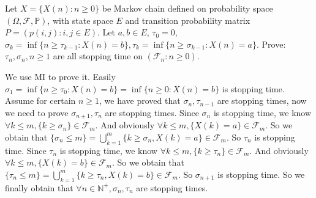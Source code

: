 \documentclass{ctexart}
\newif\ifpreface
\begin{document}
\large
\setlength{\baselineskip}{1.2em}
\ifpreface
  
\else
\fi
{}
\begin{problem}\label{pro:1}
  Let \(X=\{X(n): n \geq 0\}\) be Markov chain defined on probability space \((\Omega,\mathscr{F},\mathbb{P})\), with state space \(E\) and
  transition probability matrix \(P=(p(i,j):i,j \in E)\). Let \(a, b \in E\), \(\tau_0 =0\), \(\sigma_k = \inf \{n \geq \tau_{k-1}: X(n)=b\}, \tau_k=\inf\{n \geq \sigma_{k-1}: X(n)=a\}\).
  Prove: \(\tau_n,\sigma_n, n \geq 1 \) are all stopping time on \((\mathscr{F}_n: n \geq 0)\).
\end{problem}

\begin{solution}
  We use MI to prove it. Easily \(\sigma_1=\inf \{n \geq \tau_0:X(n)=b\}=\inf \{n \geq 0:X(n)=b\}\) is stopping time.
  Assume for certain \(n \geq 1\), we have proved that \(\sigma_n,\tau_{n-1}\) are stopping times, now we need to prove \(\sigma_{n+1},\tau_n\) are stopping times.
  Since \(\sigma_n\) is stopping time, we know \(\forall k \leq m,\{k \geq \sigma_n\} \in \mathcal{F}_m\).
  And obviously \(\forall k \leq m,\{X(k)=a\}\in \mathcal{F}_m\). So we obtain that \(\{\sigma_n \leq m\}=\bigcup_{k=1}^{m} \{k \geq \sigma_n,X(k)=a\} \in \mathcal{F}_m\).
  So \(\tau_n\) is stopping time.
  Since \(\tau_n\) is stopping time, we know \(\forall k \leq m,\{k \geq \tau_n\} \in \mathcal{F}_m\).
  And obviously \(\forall k \leq m,\{X(k)=b\}\in \mathcal{F}_m\). So we obtain that \(\{\tau_n \leq m\}=\bigcup_{k=1}^{m} \{k \geq \tau_n,X(k)=b\} \in \mathcal{F}_m\).
  So \(\sigma_{n+1}\) is stopping time.
  So we finally obtain that \(\forall n \in \mathbb{N}^+,\sigma_n,\tau_n\) are stopping times.
\end{solution}
\end{document}
